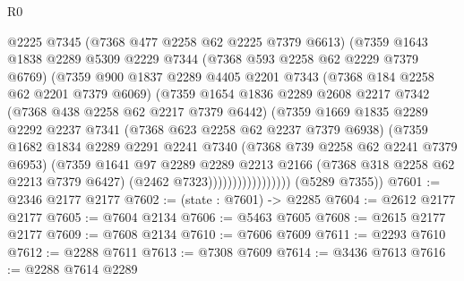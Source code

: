 \begin{lexlean}{R0}
\begin{coremodule}
                          @2225
                          @7345
                          (@7368 @477 @2258 @62 @2225 @7379 @6613)
                          (@7359
                            @1643
                            @1838
                            @2289
                            @5309
                            @2229
                            @7344
                            (@7368 @593 @2258 @62 @2229 @7379 @6769)
                            (@7359
                              @900
                              @1837
                              @2289
                              @4405
                              @2201
                              @7343
                              (@7368 @184 @2258 @62 @2201 @7379 @6069)
                              (@7359
                                @1654
                                @1836
                                @2289
                                @2608
                                @2217
                                @7342
                                (@7368 @438 @2258 @62 @2217 @7379 @6442)
                                (@7359
                                  @1669
                                  @1835
                                  @2289
                                  @2292
                                  @2237
                                  @7341
                                  (@7368 @623 @2258 @62 @2237 @7379 @6938)
                                  (@7359
                                    @1682
                                    @1834
                                    @2289
                                    @2291
                                    @2241
                                    @7340
                                    (@7368 @739 @2258 @62 @2241 @7379 @6953)
                                    (@7359
                                      @1641
                                      @97
                                      @2289
                                      @2289
                                      @2213
                                      @2166
                                      (@7368 @318 @2258 @62 @2213 @7379 @6427)
                                      (@2462 @7323)))))))))))))))))
      (@5289 @7355))
@7601 := @2346 @2177 @2177
@7602 := (state : @7601) -> @2285
@7604 := @2612 @2177 @2177
@7605 := @7604 @2134
@7606 := @5463 @7605
@7608 := @2615 @2177 @2177
@7609 := @7608 @2134
@7610 := @7606 @7609
@7611 := @2293 @7610
@7612 := @2288 @7611
@7613 := @7308 @7609
@7614 := @3436 @7613
@7616 := @2288 @7614 @2289

\end{coremodule}
\end{lexlean}
